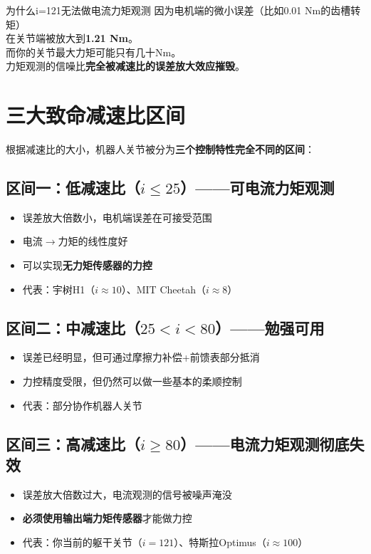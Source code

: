 \begin{cautionbox}{为什么i=121无法做电流力矩观测}
因为电机端的微小误差（比如0.01 Nm的齿槽转矩）\\
在关节端被放大到\textbf{1.21 Nm}。\\
而你的关节最大力矩可能只有几十Nm。\\
力矩观测的信噪比\textbf{完全被减速比的误差放大效应摧毁}。
\end{cautionbox}

\section{三大致命减速比区间}

根据减速比的大小，机器人关节被分为\textbf{三个控制特性完全不同的区间}：

\subsection{区间一：低减速比（$i \leq 25$）——可电流力矩观测}

\begin{itemize}
  \item 误差放大倍数小，电机端误差在可接受范围
  \item 电流$\rightarrow$力矩的线性度好
  \item 可以实现\textbf{无力矩传感器的力控}
  \item 代表：宇树H1（$i\approx 10$）、MIT Cheetah（$i\approx 8$）
\end{itemize}

\subsection{区间二：中减速比（$25 < i < 80$）——勉强可用}

\begin{itemize}
  \item 误差已经明显，但可通过摩擦力补偿+前馈表部分抵消
  \item 力控精度受限，但仍然可以做一些基本的柔顺控制
  \item 代表：部分协作机器人关节
\end{itemize}

\subsection{区间三：高减速比（$i \geq 80$）——电流力矩观测彻底失效}

\begin{itemize}
  \item 误差放大倍数过大，电流观测的信号被噪声淹没
  \item \textbf{必须使用输出端力矩传感器}才能做力控
  \item 代表：你当前的躯干关节（$i=121$）、特斯拉Optimus（$i\approx 100$）
\end{itemize}

